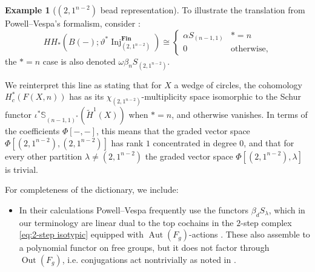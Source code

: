 \documentclass[12pt]{article}
\newcommand{\Z}{\mathbb{Z}}
\newcommand{\Q}{\mathbb{Q}}
\newcommand{\Specht}[1]{\chi_{#1}}
\newcommand{\TransposePartition}[1]{{#1}^{\ast}}
\newcommand{\Schur}[1]{\mathbb{S}_{#1}}
\DeclareMathOperator{\Aut}{Aut}
\DeclareMathOperator{\Out}{Out}
\theoremstyle{plain}
\theoremstyle{definition}
\newtheorem{expl}[thm]{Example}
\theoremstyle{remark}
\begin{document}
\begin{itemize}
\end{itemize}

\begin{expl}[$(2,1^{n-2})$ bead representation] \label{ex:(2,1)-bead rep}
To illustrate the translation from Powell--Vespa's formalism, consider \cite[Example 4]{PV18}:
\begin{equation}
    HH_*(B(-);\vartheta^*\operatorname{Inj}^{\textbf{Fin}}_{(2,1^{n-2})}) \cong \begin{cases}
    \alpha S_{(n-1,1)} & *=n \\
    0 & \text{otherwise},
    \end{cases}
\end{equation}
the $*=n$ case is also denoted $\omega \beta_{n} S_{(2,1^{n-2})}$.

We reinterpret this line as stating that for $X$ a wedge of circles, the cohomology $H^{*}_c(F(X,n))$ has as its $\Specht{(2,1^{n-2})}$-multiplicity space isomorphic to the Schur functor $\iota^*\Schur{\TransposePartition{(n-1,1)}}(\tilde{H}^1(X))$ when $*=n$, and otherwise vanishes. In terms of the coefficients $\Phi[-,-]$, this means that the graded vector space $\Phi[(2,1^{n-2}), (2,1^{n-2})]$ has rank $1$ concentrated in degree $0$, and that for every other partition $\lambda\neq (2,1^{n-2})$ the graded vector space $\Phi[(2,1^{n-2}), \lambda]$ is trivial.
\end{expl}

For completeness of the dictionary, we include:
\begin{itemize}
    \item In their calculations Powell--Vespa frequently use the functors $\beta_d S_\lambda$, which in our terminology are linear dual to the top cochains in the $2$-step complex \eqref{eq:2-step isotypic} equipped with $\Aut(F_g)$-actions . These also assemble to a polynomial functor on free groups, but it does not factor through $\Out(F_g)$, i.e. conjugations act nontrivially as noted in \cite[Remark 2.12]{BCGY21}.
    
\end{itemize}
\end{document}
